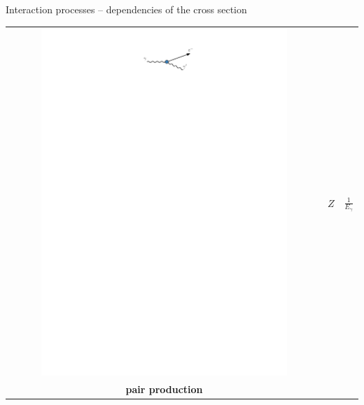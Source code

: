 \documentclass[11pt,xcolor=dvipsnames,professionalfonts,notes]{beamer}
\begin{document}
\begin{frame}{Interaction processes -- dependencies of the cross section}
\begin{center}
\begin{tabular}{ccc}
\begin{minipage}{0.3\textwidth}
				\includegraphics[width=0.8\textwidth]{./figures/compton_intro.pdf} 
				
				\vspace{0.4cm}
			\end{minipage} & $Z$ & $\frac{1}{E_\gamma}$\\
			
			\begin{minipage}{0.3\textwidth}
				\centering
				\textbf{pair production}
				
				\vspace{0.1cm}
				

\end{minipage}
\end{tabular}
\end{center}
\end{frame}
\end{document}
